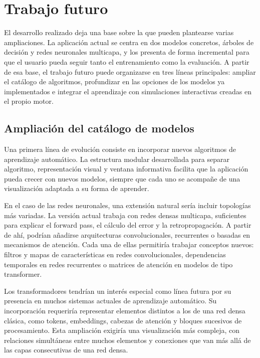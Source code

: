 \chapter{Trabajo futuro}
\label{chap:trabajo_futuro}

El desarrollo realizado deja una base sobre la que pueden plantearse varias ampliaciones. La aplicación actual se centra en dos modelos concretos, árboles de decisión y redes neuronales multicapa, y los presenta de forma incremental para que el usuario pueda seguir tanto el entrenamiento como la evaluación. A partir de esa base, el trabajo futuro puede organizarse en tres líneas principales: ampliar el catálogo de algoritmos, profundizar en las opciones de los modelos ya implementados e integrar el aprendizaje con simulaciones interactivas creadas en el propio motor.

\section{Ampliación del catálogo de modelos}

Una primera línea de evolución consiste en incorporar nuevos algoritmos de aprendizaje automático. La estructura modular desarrollada para separar algoritmo, representación visual y ventana informativa facilita que la aplicación pueda crecer con nuevos modelos, siempre que cada uno se acompañe de una visualización adaptada a su forma de aprender.

En el caso de las redes neuronales, una extensión natural sería incluir topologías más variadas. La versión actual trabaja con redes densas multicapa, suficientes para explicar el forward pass, el cálculo del error y la retropropagación. A partir de ahí, podrían añadirse arquitecturas convolucionales, recurrentes o basadas en mecanismos de atención. Cada una de ellas permitiría trabajar conceptos nuevos: filtros y mapas de características en redes convolucionales, dependencias temporales en redes recurrentes o matrices de atención en modelos de tipo transformer.

Los transformadores tendrían un interés especial como línea futura por su presencia en muchos sistemas actuales de aprendizaje automático. Su incorporación requeriría representar elementos distintos a los de una red densa clásica, como tokens, embeddings, cabezas de atención y bloques sucesivos de procesamiento. Esta ampliación exigiría una visualización más compleja, con relaciones simultáneas entre muchos elementos y conexiones que van más allá de las capas consecutivas de una red densa.


